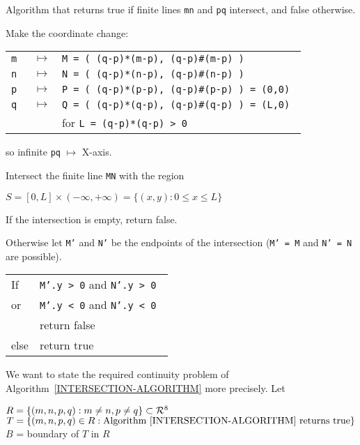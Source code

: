 \documentclass[12pt]{article}
\begin{document}
\begin{algorithm}\label{INTERSECTION-ALGORITHM}
Algorithm that returns true if finite lines {\tt mn} and {\tt pq}
intersect, and false otherwise.

Make the coordinate change:
\begin{center}
\begin{tabular}{rcl}
\tt m & $\longmapsto$ & \tt M = ( (q-p)*(m-p), (q-p)\#(m-p) ) \\
\tt n & $\longmapsto$ & \tt N = ( (q-p)*(n-p), (q-p)\#(n-p) ) \\
\tt p & $\longmapsto$ & \tt P = ( (q-p)*(p-p), (q-p)\#(p-p) ) = (0,0) \\
\tt q & $\longmapsto$ & \tt Q = ( (q-p)*(q-p), (q-p)\#(q-p) ) = (L,0) \\
      &               & for {\tt L = (q-p)*(q-p) > 0} \\
\end{tabular}
\end{center}

so infinite {\tt pq} $\longmapsto$ X-axis.

Intersect the finite line {\tt MN} with the region
\begin{center}
$S = [0,L]\times(-\infty,+\infty) = \{(x,y):0\leq x\leq L\}$
\end{center}

If the intersection is empty, return false.

Otherwise let {\tt M'} and {\tt N'} be the endpoints of the intersection
({\tt M' = M} and {\tt N' = N} are possible).
\begin{center}
\begin{tabular}{ll}
If & {\tt M'.y > 0} and {\tt N'.y > 0 } \\
or & {\tt M'.y < 0} and {\tt N'.y < 0 } \\
   & return false \\
else & return true \\
\end{tabular}
\end{center}

\end{algorithm}

We want to state the required continuity problem of
Algorithm~\ref{INTERSECTION-ALGORITHM} more precisely.
Let
\begin{center}
$R=\{(m,n,p,q): m\neq n, p\neq q\} \subset {\cal R}^8$ \\
$T=\{(m,n,p,q)\in R:
     \textrm{Algorithm~\ref{INTERSECTION-ALGORITHM} returns true}\}$ \\
$B$ = boundary of $T$ in $R$
\end{center}
\end{document}
